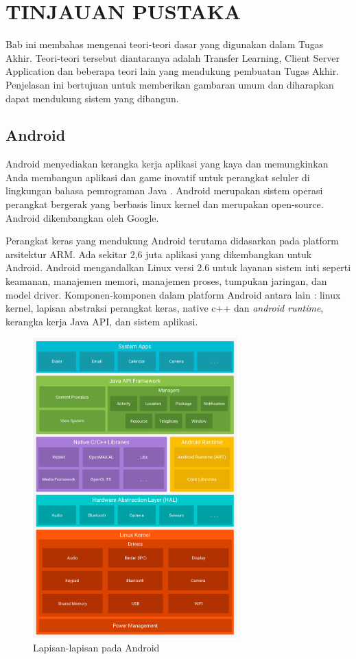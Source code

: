 \chapter {TINJAUAN PUSTAKA}
Bab ini membahas mengenai teori-teori dasar yang digunakan dalam Tugas Akhir. Teori-teori tersebut diantaranya adalah Transfer Learning, Client Server Application dan beberapa teori lain yang mendukung pembuatan Tugas Akhir. Penjelasan ini bertujuan untuk memberikan gambaran umum dan diharapkan dapat mendukung sistem yang dibangun.
\section{Android}
\par Android menyediakan kerangka kerja aplikasi yang kaya dan memungkinkan Anda membangun aplikasi dan game inovatif untuk perangkat seluler di lingkungan bahasa pemrograman Java \cite{android_def}.   Android merupakan sistem operasi perangkat bergerak yang berbasis linux kernel dan merupakan open-source. Android dikembangkan oleh Google.

\par Perangkat keras yang mendukung Android terutama didasarkan pada platform arsitektur ARM. Ada sekitar 2,6 juta aplikasi yang dikembangkan untuk Android. Android mengandalkan Linux versi 2.6 untuk layanan sistem inti seperti keamanan, manajemen memori, manajemen proses, tumpukan jaringan, dan model driver. Komponen-komponen dalam platform Android antara lain : linux kernel, lapisan abstraksi perangkat keras, native c++ dan \textit{android runtime}, kerangka kerja Java API, dan sistem aplikasi.
\begin{figure}[!ht]
	\centering\includegraphics[width=0.7\textwidth]{bab2/figures/android-stack.png}
	\caption{Lapisan-lapisan pada Android}
	\label{fig:transfer-works}
\end{figure}

